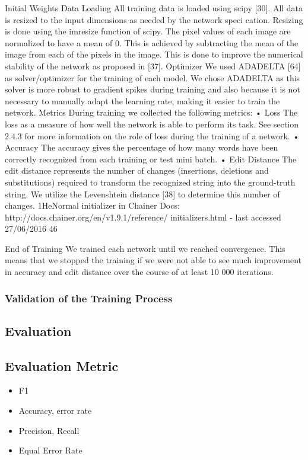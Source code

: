 Initial Weights Data Loading All training data is loaded using scipy [30]. All data is resized to the input dimensions as needed by the network speci cation. Resizing is done using the imresize function of scipy. The pixel values of each image are normalized to have a mean of 0. This is achieved by subtracting the mean of the image from each of the pixels in the image. This is done to improve the numerical stability of the network as proposed in [37].
Optimizer We used ADADELTA [64] as solver/optimizer for the training of each model. We chose ADADELTA as this solver is more robust to gradient spikes during training and also because it is not necessary to manually adapt the learning rate, making it easier to train the network.
Metrics During training we collected the following metrics:
• Loss The loss as a measure of how well the network is able to perform its task. See section 2.4.3 for more information on the role of loss during the training of a network.
• Accuracy The accuracy gives the percentage of how many words have been correctly recognized from each training or test mini batch.
• Edit Distance The edit distance represents the number of changes (insertions, deletions and substitutions) required to transform the recognized string into the ground-truth string. We utilize the Levenshtein distance [38] to determine this number of changes.
1HeNormal initializer in Chainer Docs: http://docs.chainer.org/en/v1.9.1/reference/ initializers.html - last accessed 27/06/2016
46
 
End of Training We trained each network until we reached convergence. This means that we stopped the training if we were not able to see much improvement in accuracy and edit distance over the course of at least 10 000 iterations.


\subsubsection{Validation of the Training Process} 
\label{sec:validation}

\subsection{Evaluation} 

\subsection{Evaluation Metric} 
\label{sec:metrics}
\begin{itemize}
    \item F1
    \item Accuracy, error rate
    \item Precision, Recall
    \item Equal Error Rate
\end{itemize}

